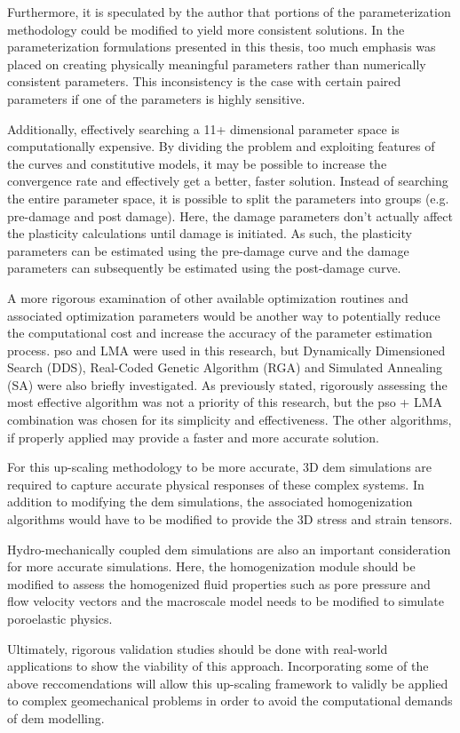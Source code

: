 Furthermore, it is speculated by the author that portions of the parameterization methodology could be modified to yield more consistent solutions. In the parameterization formulations presented in this thesis, too much emphasis was placed on creating physically meaningful parameters rather than numerically consistent parameters. This inconsistency is the case with certain paired parameters if one of the parameters is highly sensitive.

Additionally, effectively searching a 11+ dimensional parameter space is computationally expensive. By dividing the problem and exploiting features of the curves and constitutive models, it may be possible to increase the convergence rate and effectively get a better, faster solution. Instead of searching the entire parameter space, it is possible to split the parameters into groups (e.g. pre-damage and post damage). Here, the damage parameters don't actually affect the plasticity calculations until damage is initiated. As such, the plasticity parameters can be estimated using the pre-damage curve and the damage parameters can subsequently be estimated using the post-damage curve.

A more rigorous examination of other available optimization routines and associated optimization parameters would be another way to potentially reduce the computational cost and increase the accuracy of the parameter estimation process. \acrshort{pso} and LMA were used in this research, but Dynamically Dimensioned Search (DDS), 
Real-Coded Genetic Algorithm (RGA) and Simulated Annealing (SA) were also briefly investigated. As previously stated, rigorously assessing the most effective algorithm was not a priority of this research, but the \acrshort{pso} + LMA combination was chosen for its simplicity and effectiveness. The other algorithms, if properly applied may provide a faster and more accurate solution.
	
For this up-scaling methodology to be more accurate, 3D \acrshort{dem} simulations are required to capture accurate physical responses of these complex systems. In addition to modifying the \acrshort{dem} simulations, the associated homogenization algorithms would have to be modified to provide the 3D stress and strain tensors. 

Hydro-mechanically coupled \acrshort{dem} simulations are also an important consideration for more accurate simulations. Here, the homogenization module should be modified to assess the homogenized fluid properties such as pore pressure and flow velocity vectors and the macroscale model needs to be modified to simulate poroelastic physics.

Ultimately, rigorous validation studies should be done with real-world applications to show the viability of this approach. Incorporating some of the above reccomendations will allow this up-scaling framework to validly be applied to complex geomechanical problems in order to avoid the computational demands of \acrshort{dem} modelling. 